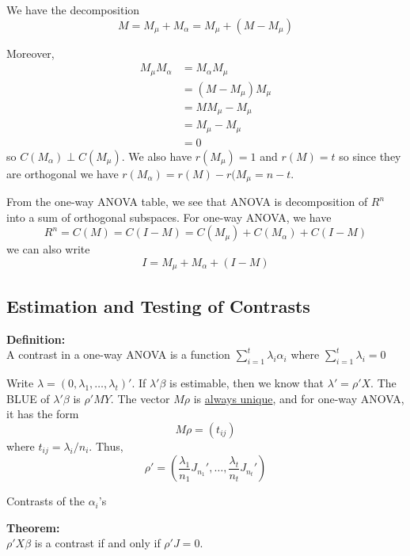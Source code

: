 \documentclass[12pt]{article}
\numberwithin{equation}{section}
\begin{document}
We have the decomposition
\begin{equation*}
  M = M_{\mu} + M_{\alpha} = M_{\mu} + (M - M_\mu)
\end{equation*}

Moreover,
\begin{align*}
  M_{\mu} M_{\alpha} &= M_{\alpha} M_{\mu} \\
    &= (M - M_\mu)M_\mu \\
    &= MM_\mu - M_{\mu} \\
    &= M_{\mu} - M_{\mu} \\
    &= 0
\end{align*}
so $C(M_\alpha) \perp C(M_{\mu})$. We also have $r(M_\mu) = 1$ and $r(M) = t$ so since they are orthogonal we have $r(M_\alpha) = r(M) - r(M_{\mu} = n - t$.

From the one-way ANOVA table, we see that ANOVA is decomposition of $R^n$ into a sum of orthogonal subspaces. For one-way ANOVA, we have
\begin{equation*}
  R^n = C(M) = C(I - M) = C(M_{\mu}) + C(M_{\alpha}) + C(I - M)
\end{equation*}
we can also write
\begin{equation*}
  I = M_\mu + M_{\alpha} + (I - M)
\end{equation*}

\subsection{Estimation and Testing of Contrasts}
\textbf{Definition:}\\
A contrast in a one-way ANOVA is a function $\sum_{i=1}^t \lambda_i \alpha_i$ where $\sum_{i=1}^t \lambda_i = 0$

Write $\lambda = (0, \lambda_1, \ldots, \lambda_t)'$. If $\lambda'\beta$ is estimable, then we know that $\lambda' = \rho'X$. The BLUE of $\lambda'\beta$ is $\rho'MY$. The vector $M\rho$ is \underline{always unique}, and for one-way ANOVA, it has the form
\begin{equation*}
  M\rho = (t_{ij})
\end{equation*}
where $t_{ij} = \lambda_i / n_i$. Thus,
\begin{equation*}
  \rho' = \left(
  \frac{\lambda_1}{n_1} J_{n_1}', \ldots, \frac{\lambda_t}{n_t} J_{n_t}'
  \right)
\end{equation*}

Contrasts of the $\alpha_i$'s

\textbf{Theorem:} \\
$\rho' X \beta$ is a contrast if and only if $\rho'J = 0$.
\end{document}

